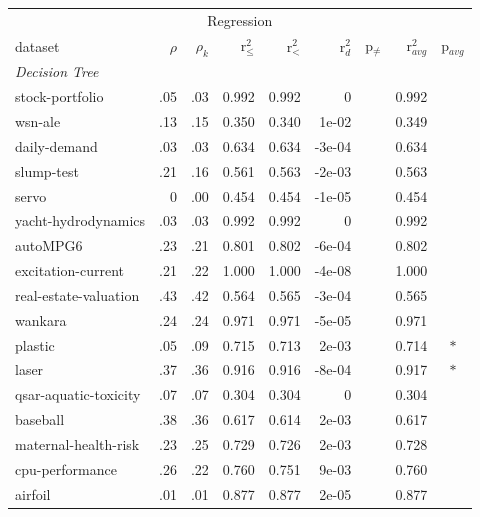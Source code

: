 \begin{tabular}{l@{\hspace{3pt}}r@{\hspace{3pt}}r@{\hspace{3pt}}r@{\hspace{3pt}}r@{\hspace{3pt}}r@{\hspace{3pt}}c@{\hspace{3pt}}r@{\hspace{3pt}}c}
\toprule
\multicolumn{9}{c}{Regression} \\
dataset & $\rho$ & $\rho_{k}$ & r$^2_{\leq}$ & r$^2_{<}$ & r$^2_{d}$ & p$_{\neq}$ & r$^2_{avg}$ & p$_{avg}$ \\
\midrule
\multicolumn{9}{l}{\emph{Decision Tree}} \\
stock-portfolio & .05 & .03 & 0.992 & 0.992 & 0 &  & 0.992 &  \\
wsn-ale & .13 & .15 & 0.350 & 0.340 &  1e-02 &  & 0.349 &  \\
daily-demand & .03 & .03 & 0.634 & 0.634 & -3e-04 &  & 0.634 &  \\
slump-test & .21 & .16 & 0.561 & 0.563 & -2e-03 &  & 0.563 &  \\
servo & 0 & .00 & 0.454 & 0.454 & -1e-05 &  & 0.454 &  \\
yacht-hydrodynamics & .03 & .03 & 0.992 & 0.992 & 0 &  & 0.992 &  \\
autoMPG6 & .23 & .21 & 0.801 & 0.802 & -6e-04 &  & 0.802 &  \\
excitation-current & .21 & .22 & 1.000 & 1.000 & -4e-08 &  & 1.000 &  \\
real-estate-valuation & .43 & .42 & 0.564 & 0.565 & -3e-04 &  & 0.565 &  \\
wankara & .24 & .24 & 0.971 & 0.971 & -5e-05 &  & 0.971 &  \\
plastic & .05 & .09 & 0.715 & 0.713 &  2e-03 &  & 0.714 & $\ast$ \\
laser & .37 & .36 & 0.916 & 0.916 & -8e-04 &  & 0.917 & $\ast$ \\
qsar-aquatic-toxicity & .07 & .07 & 0.304 & 0.304 & 0 &  & 0.304 &  \\
baseball & .38 & .36 & 0.617 & 0.614 &  2e-03 &  & 0.617 &  \\
maternal-health-risk & .23 & .25 & 0.729 & 0.726 &  2e-03 &  & 0.728 &  \\
cpu-performance & .26 & .22 & 0.760 & 0.751 &  9e-03 &  & 0.760 &  \\
airfoil & .01 & .01 & 0.877 & 0.877 &  2e-05 &  & 0.877 &  \\

\end{tabular}
